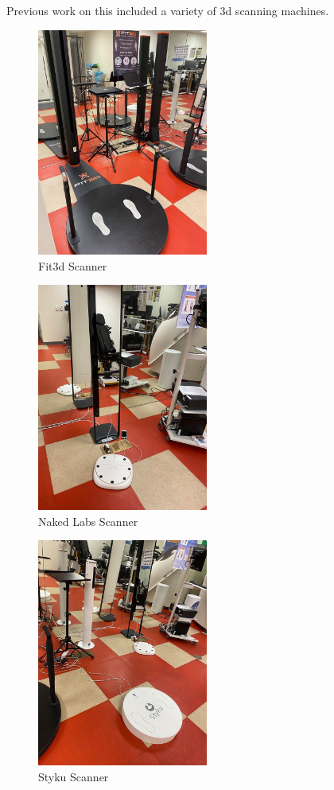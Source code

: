 Previous work on this included a variety of 3d scanning machines. 
\begin{figure}[!htb]
	\caption{Fit3d Scanner}
	\centering
	\includegraphics[width=0.5\textwidth]{images/fit3d.jpg}
\end{figure}
\begin{figure}[!htb]
	\caption{Naked Labs Scanner}
	\centering
	\includegraphics[width=0.5\textwidth]{images/naked_labs.jpg}
\end{figure}
\begin{figure}[!htb]
	\caption{Styku Scanner}
	\centering
	\includegraphics[width=0.5\textwidth]{images/styku.jpg}
\end{figure}
